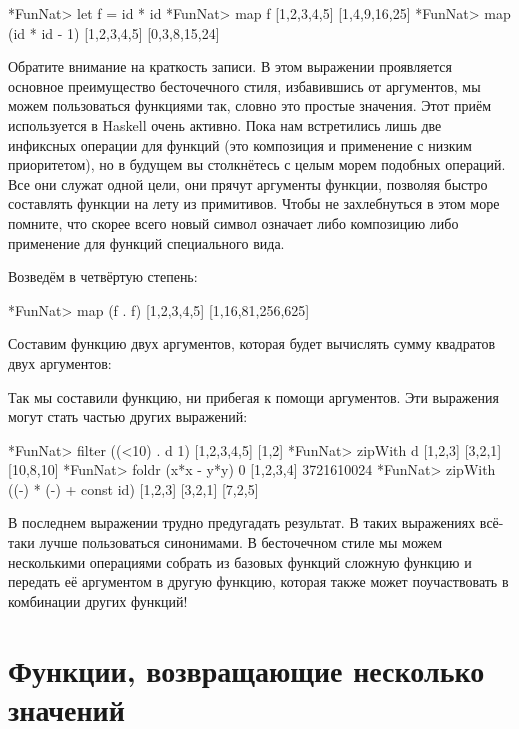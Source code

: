 \begin{code}
*FunNat> let f = id * id
*FunNat> map f [1,2,3,4,5]
[1,4,9,16,25]
*FunNat> map (id * id - 1) [1,2,3,4,5]
[0,3,8,15,24]
\end{code}

Обратите внимание на краткость записи. В этом выражении
 проявляется основное преимущество бесточечного стиля,
избавившись от аргументов, мы можем пользоваться функциями так, словно
это простые значения. Этот приём используется в Haskell очень активно.
Пока нам встретились лишь две инфиксных операции для функций (это
композиция и применение с низким приоритетом), но в будущем вы
столкнётесь с целым морем подобных операций. Все они служат одной цели,
они прячут аргументы функции, позволяя быстро составлять функции на лету
из примитивов. Чтобы не захлебнуться в этом море помните, что скорее
всего новый символ означает либо композицию либо применение для функций
специального вида.

Возведём в четвёртую степень:


\begin{code}
*FunNat> map (f . f) [1,2,3,4,5]
[1,16,81,256,625]
\end{code}

Составим функцию двух аргументов, которая будет вычислять сумму
квадратов двух аргументов:



Так мы составили функцию, ни прибегая к помощи аргументов. Эти выражения
могут стать частью других выражений:


\begin{code}
*FunNat> filter  ((<10) . d 1) [1,2,3,4,5]
[1,2]
*FunNat> zipWith d [1,2,3] [3,2,1]
[10,8,10]
*FunNat> foldr (x*x - y*y) 0 [1,2,3,4]
3721610024
*FunNat> zipWith ((-) * (-) + const id) [1,2,3] [3,2,1]
[7,2,5]
\end{code}

В последнем выражении трудно предугадать результат. В таких выражениях
всё-таки лучше пользоваться синонимами. В бесточечном стиле мы можем
несколькими операциями собрать из базовых функций сложную функцию и
передать её аргументом в другую функцию, которая также может
поучаствовать в комбинации других функций!

\section{Функции, возвращающие несколько значений}

